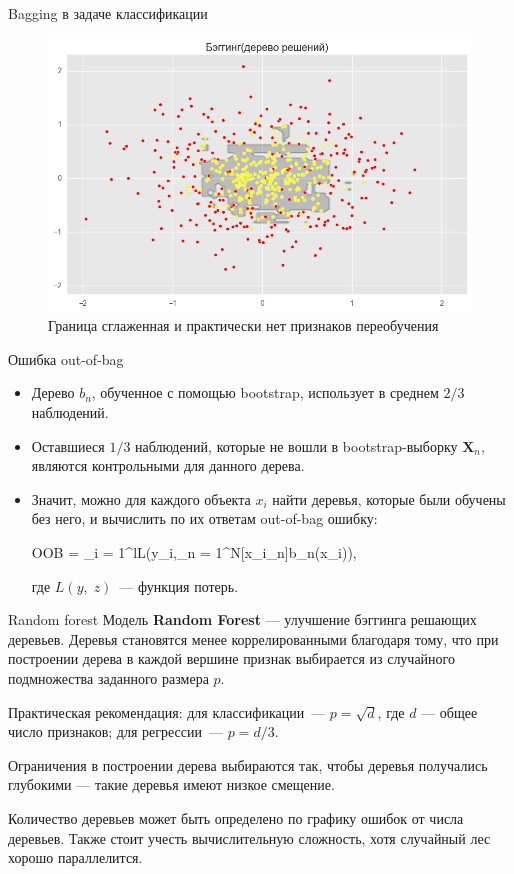 \documentclass[notheorems, handout]{beamer}
\begin{document}
\begin{frame}{Bagging в задаче классификации}
	\begin{figure}[h!]
		\includegraphics[width=1 \textwidth]{img/bagging_cl}
		\caption{Граница сглаженная и практически нет признаков переобучения}
	\end{figure}
\end{frame}

\begin{frame}{Ошибка out-of-bag}
	\begin{itemize}
		\item Дерево $b_{n}$, обученное с помощью bootstrap, использует в среднем $2/3$ наблюдений.
		\item Оставшиеся $1/3$ наблюдений, которые не вошли в bootstrap-выборку $\mathbf{X}_{n}$, являются контрольными для данного дерева.
		\item Значит, можно для каждого объекта $x_{i}$ найти деревья, которые были обучены без него, и вычислить по их ответам out-of-bag ошибку:
		\begin{flalign*}
			OOB = \displaystyle\sum_{i = 1}^{l}L\left(y_{i},\;\displaystyle\sum_{n = 1}^{N}[x_{i}\notin{}_{n}]b_{n}(x_{i})\right),
		\end{flalign*}
		где $L(y,\; z)$~--- функция потерь.
	\end{itemize}
\end{frame}

\begin{frame}{Random forest}
	Модель \textbf{Random Forest} --- улучшение бэггинга решающих деревьев. Деревья становятся менее коррелированными благодаря тому, что при построении дерева в каждой вершине признак выбирается из случайного подмножества заданного размера $p$.
	\par\smallskip
	Практическая рекомендация: для классификации~--- $p=\sqrt{d}$, где $d$ --- общее число признаков; для регрессии~--- $p = d / 3$.
	\par\smallskip
	Ограничения в построении дерева выбираются так, чтобы деревья получались глубокими --- такие деревья имеют низкое смещение.
	\par\smallskip
	Количество деревьев может быть определено по графику ошибок от числа деревьев. Также стоит учесть вычислительную сложность, хотя случайный лес хорошо параллелится.
\end{frame}
\end{document}
